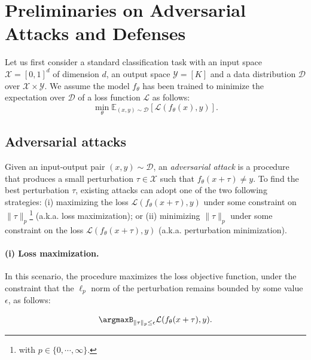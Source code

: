 \section{Preliminaries on Adversarial Attacks and Defenses}
\label{sec:preliminaries_rat}

Let us first consider a standard classification task with an input space $\mathcal{X}=[0,1]^d$ of dimension $d$,  an output space $\mathcal{Y}=[K]$ and a data distribution $\mathcal D$ over $\mathcal X \times \mathcal Y$. We assume the model $f_\theta$ has been trained to minimize the expectation over $\mathcal{D}$ of a loss function $\mathcal{L}$ as follows:
\begin{equation}
    \min_{\theta} \mathbb{E}_{(x,y) \sim \mathcal{D}} \left[ \mathcal{L}(f_\theta(x), y) \right]. 
    \label{eqn:classification}
\end{equation}

\subsection{Adversarial attacks}
\label{subsec:adversarial_attacks}
 
Given an input-output pair $(x,y) \sim \mathcal{D}$, an {\em adversarial attack} is a procedure that produces a small perturbation $\tau \in  \mathcal X$  such that $f_\theta(x + \tau) \neq y$. To find the best perturbation $\tau$, existing attacks can adopt one of the two following strategies:  (i)  maximizing the loss $\mathcal L(f_\theta(x + \tau), y)$ under some constraint on $\lVert\tau\rVert_p$\footnote{with $p \in \{0, \cdots, \infty\}$.} (a.k.a. loss maximization); or (ii)  minimizing $\lVert\tau\rVert_p$ under some constraint on the loss $\mathcal L(f_\theta(x + \tau), y)$ (a.k.a. perturbation minimization). 

\paragraph{(i) Loss maximization.} In this scenario, the procedure maximizes the loss objective function, under the constraint that the $\ell_p$ norm of the perturbation remains bounded by some value $\epsilon$, as follows:  

\begin{equation}
  \argmaxB_{\lVert\tau\rVert_p \leq \epsilon} \mathcal{L}(f_\theta(x+\tau),y).
  \label{eqn::lossmax}
\end{equation}

